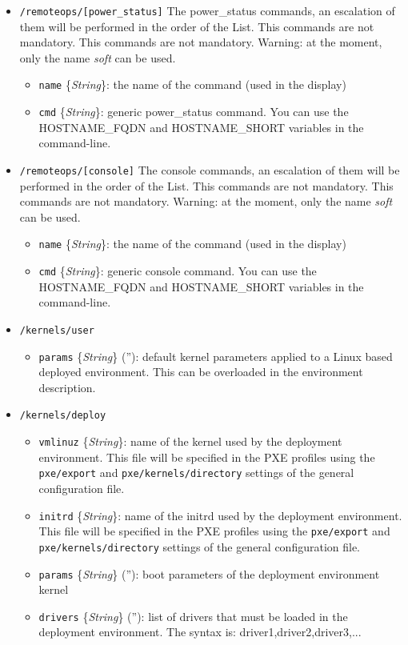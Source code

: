 \documentclass[a4wide,10pt,oneside]{book}
\newcommand{\ypath}[1]{\texttt{#1}}
\newcommand{\yfield}[2]{\texttt{#1} {\small\{{\emph{#2}}\}}:}
\newcommand{\yfieldd}[3]{\texttt{#1} {\small\{{\emph{#2}}\}} {\small(}#3{\small)}:}
\begin{document}
\begin{itemize}
  \item \ypath{/remoteops/[power\_status]} The power\_status commands, an escalation of them will be performed in the order of the List. This commands are not mandatory. This commands are not mandatory. Warning: at the moment, only the name \emph{soft} can be used.
  \begin{itemize}
    \item \yfield{name}{String} the name of the command (used in the display)
    \item \yfield{cmd}{String} generic power\_status command. You can use the HOSTNAME\_FQDN and HOSTNAME\_SHORT variables in the command-line.
  \end{itemize}

  \item \ypath{/remoteops/[console]} The console commands, an escalation of them will be performed in the order of the List. This commands are not mandatory. This commands are not mandatory. Warning: at the moment, only the name \emph{soft} can be used.
  \begin{itemize}
    \item \yfield{name}{String} the name of the command (used in the display)
    \item \yfield{cmd}{String} generic console command. You can use the HOSTNAME\_FQDN and HOSTNAME\_SHORT variables in the command-line.
  \end{itemize}

  \item \ypath{/kernels/user}
  \begin{itemize}
    \item \yfieldd{params}{String}{''} default kernel parameters applied to a Linux based deployed environment. This can be overloaded in the environment description.
  \end{itemize}

  \item \ypath{/kernels/deploy}
  \begin{itemize}
    \item \yfield{vmlinuz}{String} name of the kernel used by the deployment environment. This file will be specified in the PXE profiles using the \ypath{pxe/export} and \ypath{pxe/kernels/directory} settings of the general configuration file.
    \item \yfield{initrd}{String} name of the initrd used by the deployment environment. This file will be specified in the PXE profiles using the \ypath{pxe/export} and \ypath{pxe/kernels/directory} settings of the general configuration file.
    \item \yfieldd{params}{String}{''} boot parameters of the deployment environment kernel
    \item \yfieldd{drivers}{String}{''} list of drivers that must be loaded in the deployment environment. The syntax is: driver1,driver2,driver3,...
  \end{itemize}


\end{itemize}
\end{document}
